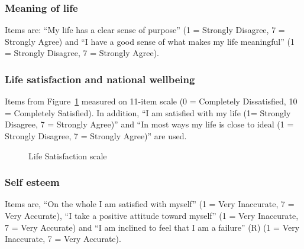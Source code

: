 \documentclass[
]{interact}
\begin{document}
\subsubsection{Meaning of life}\label{meaning-of-life}

Items are: ``My life has a clear sense of purpose'' (1 = Strongly
Disagree, 7 = Strongly Agree) and ``I have a good sense of what makes my
life meaningful'' (1 = Strongly Disagree, 7 = Strongly Agree).

\subsubsection{Life satisfaction and national
wellbeing}\label{life-satisfaction-and-national-wellbeing}

Items from Figure~\ref{fig-life-sat} measured on 11-item scale (0 =
Completely Dissatisfied, 10 = Completely Satisfied). In addition, ``I am
satisfied with my life (1= Strongly Disagree, 7 = Strongly Agree)'' and
``In most ways my life is close to ideal (1 = Strongly Disagree, 7 =
Strongly Agree)'' are used.

\begin{figure}


\caption{\label{fig-life-sat}Life Satisfaction scale}

\end{figure}%

\subsubsection{Self esteem}\label{self-esteem}

Items are, ``On the whole I am satisfied with myself'' (1 = Very
Inaccurate, 7 = Very Accurate), ``I take a positive attitude toward
myself'' (1 = Very Inaccurate, 7 = Very Accurate) and ``I am inclined to
feel that I am a failure'' (R) (1 = Very Inaccurate, 7 = Very Accurate).
\end{document}
